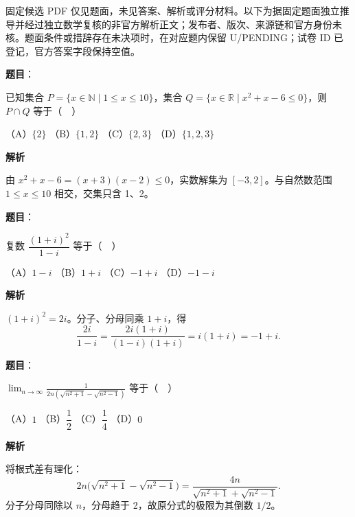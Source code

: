 

\begin{gktip}
固定候选 PDF 仅见题面，未见答案、解析或评分材料。以下为据固定题面独立推导并经过独立数学复核的非官方解析正文；发布者、版次、来源链和官方身份未核。题面条件或措辞存在未决项时，在对应题内保留 U/PENDING；试卷 ID 已登记，官方答案字段保持空值。
\end{gktip}

\begin{answer}

\textbf{题目}：

已知集合 \(P=\{x\in\mathbb N\mid 1\le x\le 10\}\)，集合 \(Q=\{x\in\mathbb R\mid x^2+x-6\le 0\}\)，则 \(P\cap Q\) 等于（　）

（A）\(\{2\}\)
（B）\(\{1,2\}\)
（C）\(\{2,3\}\)
（D）\(\{1,2,3\}\)

\textbf{解析}

由 \(x^2+x-6=(x+3)(x-2)\le 0\)，实数解集为 \([-3,2]\)。与自然数范围 \(1\le x\le10\) 相交，交集只含 1、2。


\end{answer}
\begin{answer}

\textbf{题目}：

复数 \(\dfrac{(1+i)^2}{1-i}\) 等于（　）

（A）\(1-i\)
（B）\(1+i\)
（C）\(-1+i\)
（D）\(-1-i\)

\textbf{解析}

\((1+i)^2=2i\)。分子、分母同乘 \(1+i\)，得
\nopagebreak[4]
\[
\frac{2i}{1-i}=\frac{2i(1+i)}{(1-i)(1+i)}=i(1+i)=-1+i.
\]


\end{answer}
\begin{answer}

\textbf{题目}：

\(\displaystyle \lim_{n\to\infty}\frac{1}{2n\left(\sqrt{n^2+1}-\sqrt{n^2-1}\right)}\) 等于（　）

（A）\(1\)
（B）\(\dfrac12\)
（C）\(\dfrac14\)
（D）\(0\)

\textbf{解析}

将根式差有理化：
\nopagebreak[4]
\[
2n\bigl(\sqrt{n^2+1}-\sqrt{n^2-1}\bigr)
=\frac{4n}{\sqrt{n^2+1}+\sqrt{n^2-1}}.
\]
分子分母同除以 \(n\)，分母趋于 2，故原分式的极限为其倒数 \(1/2\)。


\end{answer}
